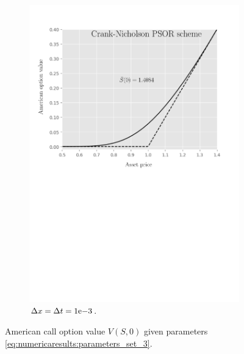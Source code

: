 \begin{figure}[tbp]
\begin{subfigure}{0.4\textwidth}
    \includegraphics[width=\textwidth]{chapters/chapter5/TestCase3CrankNicholsonLCP.pdf}
    \caption{$\Delta{x}=\Delta{t}={1}\mathrm{e}{-3}$.}
  \end{subfigure}
  \caption{American call option value $V(S, 0)$ given parameters \eqref{eq:numericaresults:parameters_set_3}.}
  \label{fig:lcp:numericaresults:test_case_3}
\end{figure}

